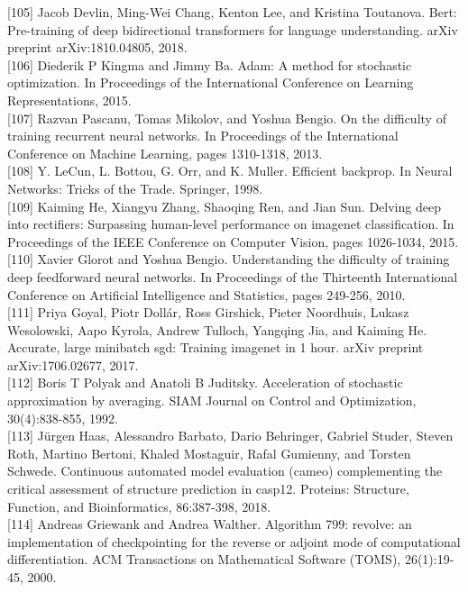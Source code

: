 \documentclass[10pt]{article}
\begin{document}
[105] Jacob Devlin, Ming-Wei Chang, Kenton Lee, and Kristina Toutanova. Bert: Pre-training of deep bidirectional transformers for language understanding. arXiv preprint arXiv:1810.04805, 2018.\\[0pt]
[106] Diederik P Kingma and Jimmy Ba. Adam: A method for stochastic optimization. In Proceedings of the International Conference on Learning Representations, 2015.\\[0pt]
[107] Razvan Pascanu, Tomas Mikolov, and Yoshua Bengio. On the difficulty of training recurrent neural networks. In Proceedings of the International Conference on Machine Learning, pages 1310-1318, 2013.\\[0pt]
[108] Y. LeCun, L. Bottou, G. Orr, and K. Muller. Efficient backprop. In Neural Networks: Tricks of the Trade. Springer, 1998.\\[0pt]
[109] Kaiming He, Xiangyu Zhang, Shaoqing Ren, and Jian Sun. Delving deep into rectifiers: Surpassing human-level performance on imagenet classification. In Proceedings of the IEEE Conference on Computer Vision, pages 1026-1034, 2015.\\[0pt]
[110] Xavier Glorot and Yoshua Bengio. Understanding the difficulty of training deep feedforward neural networks. In Proceedings of the Thirteenth International Conference on Artificial Intelligence and Statistics, pages 249-256, 2010.\\[0pt]
[111] Priya Goyal, Piotr Dollár, Ross Girshick, Pieter Noordhuis, Lukasz Wesolowski, Aapo Kyrola, Andrew Tulloch, Yangqing Jia, and Kaiming He. Accurate, large minibatch sgd: Training imagenet in 1 hour. arXiv preprint arXiv:1706.02677, 2017.\\[0pt]
[112] Boris T Polyak and Anatoli B Juditsky. Acceleration of stochastic approximation by averaging. SIAM Journal on Control and Optimization, 30(4):838-855, 1992.\\[0pt]
[113] Jürgen Haas, Alessandro Barbato, Dario Behringer, Gabriel Studer, Steven Roth, Martino Bertoni, Khaled Mostaguir, Rafal Gumienny, and Torsten Schwede. Continuous automated model evaluation (cameo) complementing the critical assessment of structure prediction in casp12. Proteins: Structure, Function, and Bioinformatics, 86:387-398, 2018.\\[0pt]
[114] Andreas Griewank and Andrea Walther. Algorithm 799: revolve: an implementation of checkpointing for the reverse or adjoint mode of computational differentiation. ACM Transactions on Mathematical Software (TOMS), 26(1):19-45, 2000.\\[0pt]
\end{document}
